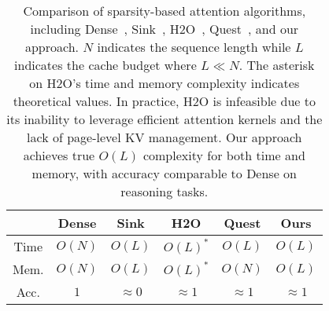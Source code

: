 \begin{table}[ht]
\begin{tabular}{cccccc}
\toprule
{} & 
{Dense} & 
{Sink} & 
{H2O} & 
{Quest} & 
{Ours} \\ 
\midrule
{Time} & 
{$O(N)$} & 
{$O(L)$} & 
{$O(L)^*$} & 
{$O(L)$} &
{$O(L)$} \\ 
\midrule
{Mem.} &
{$O(N)$} & 
{$O(L)$} & 
{$O(L)^*$}  & 
{$O(N)$} & 
{$O(L)$} \\ 
\midrule
{Acc.} & 
{$1$} & 
{$\approx0$} & 
{$\approx1$} & 
{$\approx1$} & 
{$\approx1$} \\ 
\bottomrule
\end{tabular}
\centering
\caption{Comparison of sparsity-based attention algorithms, including Dense~\cite{vaswani2017attention}, Sink~\cite{xiao2023efficient}, H2O~\cite{zhang2023h2o}, Quest~\cite{tang2024quest}, and our approach. $N$ indicates the sequence length while $L$ indicates the cache budget where $L\ll N$. The asterisk on H2O’s time and memory complexity indicates theoretical values. In practice, H2O is infeasible due to its inability to leverage efficient attention kernels and the lack of page-level KV management. Our approach achieves true $O(L)$ complexity for both time and memory, with accuracy comparable to Dense on reasoning tasks.}
\label{tbl-intro-positioning}
\end{table}